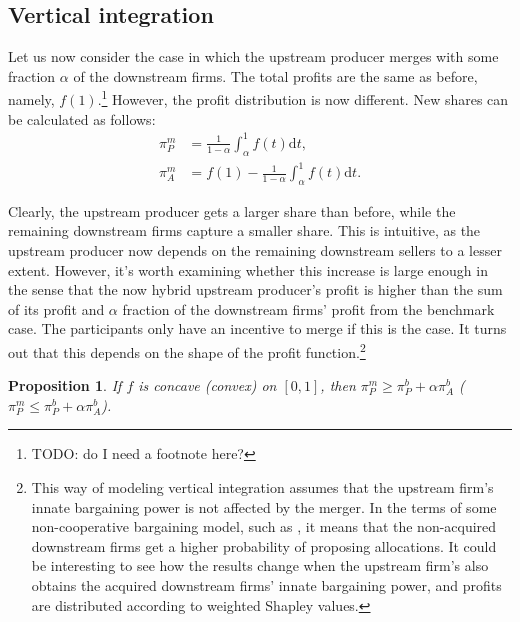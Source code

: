 \documentclass[a4paper]{article}
\newtheorem{proposition}{Proposition}
\newcommand{\dt}{\mathrm{d}t}
\begin{document}
\subsection{Vertical integration}

Let us now consider the case in which the upstream producer merges with some fraction $\alpha$ of the downstream firms.
The total profits are the same as before, namely, $f(1)$.\footnote{
    TODO: do I need a footnote here?
}
However, the profit distribution is now different.
New shares can be calculated as follows:
\begin{align}
    \pi_{P}^m & = \frac{1}{1 - \alpha} \int_\alpha^1 f(t) \dt, \\
    \pi_{A}^m & = f(1) - \frac{1}{1 - \alpha} \int_\alpha^1 f(t) \dt .
\end{align}

Clearly, the upstream producer gets a larger share than before, while the remaining downstream firms capture a smaller share.
This is intuitive, as the upstream producer now depends on the remaining downstream sellers to a lesser extent.
However, it's worth examining whether this increase is large enough in the sense that the now hybrid upstream producer's profit is higher than the sum of its profit and $\alpha$ fraction of the downstream firms' profit from the benchmark case.
The participants only have an incentive to merge if this is the case.
It turns out that this depends on the shape of the profit function.\footnote{
    This way of modeling vertical integration assumes that the upstream firm's innate bargaining power is not affected by the merger.
    In the terms of some non-cooperative bargaining model, such as \textcite{hart1996bargaining}, it means that the non-acquired downstream firms get a higher probability of proposing allocations.
    It could be interesting to see how the results change when the upstream firm's also obtains the acquired downstream firms' innate bargaining power, and profits are distributed according to weighted Shapley values.
}

\begin{proposition}
    \label{prop:vertical_integration}
    If $f$ is concave (convex) on $[0, 1]$, then $\pi_P^m \geq \pi_P^b + \alpha \pi_A^b$ ($\pi_P^m \leq \pi_P^b + \alpha \pi_A^b$). 
\end{proposition}
\end{document}
